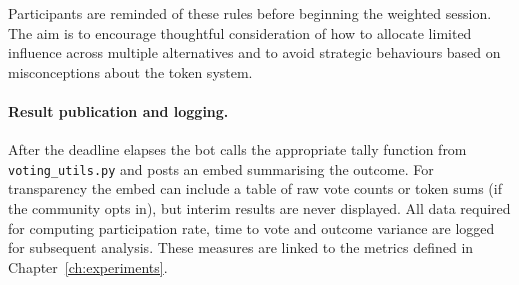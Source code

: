 Participants are reminded of these rules before beginning the weighted
session.  The aim is to encourage thoughtful consideration of how to
allocate limited influence across multiple alternatives and to avoid
strategic behaviours based on misconceptions about the token system.

\paragraph{Result publication and logging.}  After the deadline
elapses the bot calls the appropriate tally function from
\texttt{voting\_utils.py} and posts an embed summarising the outcome.
For transparency the embed can include a table of raw vote counts or
token sums (if the community opts in), but interim results are never
displayed.  All data required for computing participation rate, time to
vote and outcome variance are logged for subsequent analysis.  These
measures are linked to the metrics defined in Chapter~\ref{ch:experiments}.